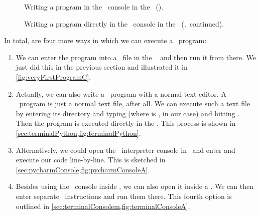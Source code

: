 %
\begin{figure}%
\centering%
%
%
%
\floatRowSep%
%
%
%
\floatRowSep%
%
%
%
\floatRowSep%
%
%
%
\caption{Writing a program in the \python\ console in the ~(\ubuntu).}%
\label{fig:terminalConsoleA}%
\end{figure}%
\begin{figure}%
\ContinuedFloat%
\centering%
%
%
%
\floatRowSep%
%
%
%
\caption{Writing a program directly in the \python\ console in the ~(\ubuntu,~continued).}%
\label{fig:terminalConsoleB}%
\end{figure}%
%
In total, are four more ways in which we can execute a \python\ program:%
%
\begin{enumerate}%
%
\item We can enter the program into a \python\ file in the \pycharm\  and then run it from there. %
We just did this in the previous section and illustrated it in \cref{fig:veryFirstProgramC}.%
%
\item Actually, we can also write a \python\ program with a normal text editor. %
A \python\ program is just a normal text file, after all. %
We can execute such a text file by entering its directory and typing  (where  is , in our case) and hitting \keys{\enter}. %
Then the program is executed directly in the . %
This process is shown in \cref{sec:terminalPython,fig:terminalPython}.%
%
\item Alternatively, we could open the \python\ interpreter console in \pycharm\ and enter and execute our code line-by-line. %
This is sketched in \cref{sec:pycharmConsole,fig:pycharmConsoleA}.%
%
\item Besides using the \python\ console inside \pycharm, we can also open it inside a . %
We can then enter separate \python\ instructions and run them there. %
This fourth option is outlined in \cref{sec:terminalConsolem,fig:terminalConsoleA}.%
%
\end{enumerate}%
